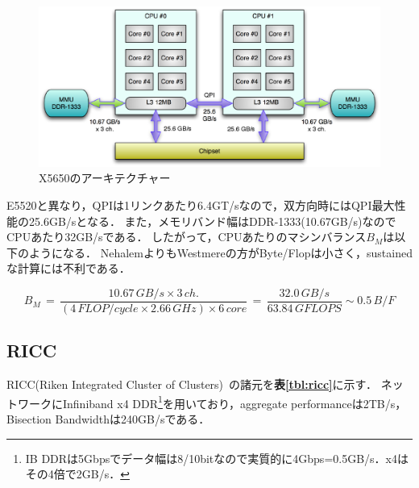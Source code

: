 \begin{figure}[htdp]
\begin{center}
\includegraphics[width=14cm,clip]{X5650_arch.eps}
\end{center}
\caption{X5650のアーキテクチャー}
\label{fig:westmere}
\end{figure}

E5520と異なり，QPIは1リンクあたり6.4GT/sなので，双方向時にはQPI最大性能の25.6GB/sとなる．
また，メモリバンド幅はDDR-1333(10.67GB/s)なのでCPUあたり32GB/sである．
したがって，CPUあたりのマシンバランス$B_M$は以下のようになる．
NehalemよりもWestmereの方がByte/Flopは小さく，sustainedな計算には不利である．

\begin{equation}
B_M \,=\, \frac{10.67\,GB/s \times 3\,ch.}{(4\,FLOP/cycle \times 2.66\,GHz) \times 6\,core} \,=\, \frac{32.0\,GB/s}{63.84\,GFLOPS} \sim 0.5\,B/F
\label{eq:B_M westmere}
\end{equation}




%
\subsection{RICC}

RICC(Riken Integrated Cluster of Clusters)~\cite{ricc}の諸元を\textbf{表\ref{tbl:ricc}}に示す．
ネットワークにInfiniband x4 DDR\footnote{IB DDRは5Gbpsでデータ幅は8/10bitなので実質的に4Gbps=0.5GB/s．x4はその4倍で2GB/s．}を用いており，aggregate performanceは2TB/s，Bisection Bandwidthは240GB/sである．


